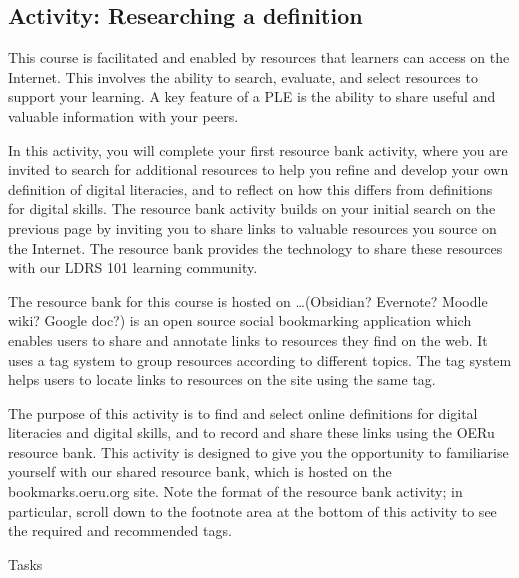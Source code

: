 \documentclass[
]{book}
\theoremstyle{definition}
\theoremstyle{definition}
\theoremstyle{definition}
\theoremstyle{definition}
\theoremstyle{remark}
\begin{document}
\hypertarget{activity-researching-a-definition}{%
\subsection*{Activity: Researching a definition}\label{activity-researching-a-definition}}

\begin{reflect}
This course is facilitated and enabled by resources that learners can access on the Internet. This involves the ability to search, evaluate, and select resources to support your learning. A key feature of a PLE is the ability to share useful and valuable information with your peers.

In this activity, you will complete your first resource bank activity, where you are invited to search for additional resources to help you refine and develop your own definition of digital literacies, and to reflect on how this differs from definitions for digital skills. The resource bank activity builds on your initial search on the previous page by inviting you to share links to valuable resources you source on the Internet. The resource bank provides the technology to share these resources with our LDRS 101 learning community.

The resource bank for this course is hosted on \ldots(Obsidian? Evernote? Moodle wiki? Google doc?) is an open source social bookmarking application which enables users to share and annotate links to resources they find on the web. It uses a tag system to group resources according to different topics. The tag system helps users to locate links to resources on the site using the same tag.

The purpose of this activity is to find and select online definitions for digital literacies and digital skills, and to record and share these links using the OERu resource bank. This activity is designed to give you the opportunity to familiarise yourself with our shared resource bank, which is hosted on the bookmarks.oeru.org site. Note the format of the resource bank activity; in particular, scroll down to the footnote area at the bottom of this activity to see the required and recommended tags.

Tasks


\end{reflect}
\end{document}
